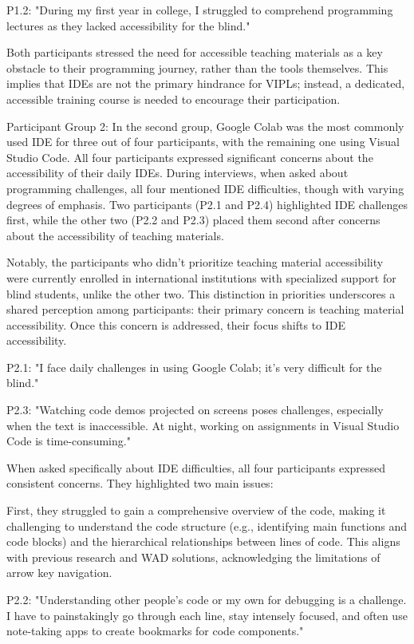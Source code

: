 P1.2: "During my first year in college, I struggled to comprehend programming lectures as they lacked accessibility for the blind."

Both participants stressed the need for accessible teaching materials as a key obstacle to their programming journey, rather than the tools themselves. This implies that IDEs are not the primary hindrance for VIPLs; instead, a dedicated, accessible training course is needed to encourage their participation.

Participant Group 2: In the second group, Google Colab was the most commonly used IDE for three out of four participants, with the remaining one using Visual Studio Code. All four participants expressed significant concerns about the accessibility of their daily IDEs. During interviews, when asked about programming challenges, all four mentioned IDE difficulties, though with varying degrees of emphasis. Two participants (P2.1 and P2.4) highlighted IDE challenges first, while the other two (P2.2 and P2.3) placed them second after concerns about the accessibility of teaching materials.

Notably, the participants who didn't prioritize teaching material accessibility were currently enrolled in international institutions with specialized support for blind students, unlike the other two. This distinction in priorities underscores a shared perception among participants: their primary concern is teaching material accessibility. Once this concern is addressed, their focus shifts to IDE accessibility.

P2.1: "I face daily challenges in using Google Colab; it's very difficult for the blind."

P2.3: "Watching code demos projected on screens poses challenges, especially when the text is inaccessible. At night, working on assignments in Visual Studio Code is time-consuming."

When asked specifically about IDE difficulties, all four participants expressed consistent concerns. They highlighted two main issues:

First, they struggled to gain a comprehensive overview of the code, making it challenging to understand the code structure (e.g., identifying main functions and code blocks) and the hierarchical relationships between lines of code. This aligns with previous research and WAD solutions, acknowledging the limitations of arrow key navigation.

P2.2: "Understanding other people's code or my own for debugging is a challenge. I have to painstakingly go through each line, stay intensely focused, and often use note-taking apps to create bookmarks for code components."

